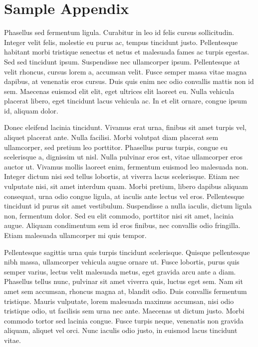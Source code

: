 \section{Sample Appendix}

Phasellus sed fermentum ligula. Curabitur in leo id felis cursus sollicitudin. Integer velit felis, molestie eu purus ac, tempus tincidunt justo. Pellentesque habitant morbi tristique senectus et netus et malesuada fames ac turpis egestas. Sed sed tincidunt ipsum. Suspendisse nec ullamcorper ipsum. Pellentesque at velit rhoncus, cursus lorem a, accumsan velit. Fusce semper massa vitae magna dapibus, at venenatis eros cursus. Duis quis enim nec odio convallis mattis non id sem. Maecenas euismod elit elit, eget ultrices elit laoreet eu. Nulla vehicula placerat libero, eget tincidunt lacus vehicula ac. In et elit ornare, congue ipsum id, aliquam dolor.

Donec eleifend lacinia tincidunt. Vivamus erat urna, finibus sit amet turpis vel, aliquet placerat ante. Nulla facilisi. Morbi volutpat diam placerat sem ullamcorper, sed pretium leo porttitor. Phasellus purus turpis, congue eu scelerisque a, dignissim ut nisl. Nulla pulvinar eros est, vitae ullamcorper eros auctor ut. Vivamus mollis laoreet enim, fermentum euismod leo malesuada non. Integer dictum nisi sed tellus lobortis, at viverra lacus scelerisque. Etiam nec vulputate nisi, sit amet interdum quam. Morbi pretium, libero dapibus aliquam consequat, urna odio congue ligula, at iaculis ante lectus vel eros. Pellentesque tincidunt id purus sit amet vestibulum. Suspendisse a nulla iaculis, dictum ligula non, fermentum dolor. Sed eu elit commodo, porttitor nisi sit amet, lacinia augue. Aliquam condimentum sem id eros finibus, nec convallis odio fringilla. Etiam malesuada ullamcorper mi quis tempor.

Pellentesque sagittis urna quis turpis tincidunt scelerisque. Quisque pellentesque nibh massa, ullamcorper vehicula augue ornare ut. Fusce lobortis, purus quis semper varius, lectus velit malesuada metus, eget gravida arcu ante a diam. Phasellus tellus nunc, pulvinar sit amet viverra quis, luctus eget sem. Nam sit amet sem accumsan, rhoncus magna at, blandit odio. Duis convallis fermentum tristique. Mauris vulputate, lorem malesuada maximus accumsan, nisi odio tristique odio, ut facilisis sem urna nec ante. Maecenas ut dictum justo. Morbi commodo tortor sed lacinia congue. Fusce turpis neque, venenatis non gravida aliquam, aliquet vel orci. Nunc iaculis odio justo, in euismod lacus tincidunt vitae. 

